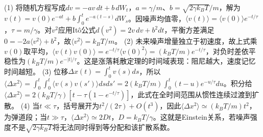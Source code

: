 (1) 将随机方程写成\(dv=-av\,dt+b\,dW_t\)，\(a=\gamma/m\)、\(b=\sqrt{2\gamma k_BT}/m\)，解为\(v(t)=v(0)e^{-at}+b\int_0^te^{-a(t-s)}dW_s\)。因噪声均值零，\(\langle v(t)\rangle=\langle v(0)\rangle e^{-t/\tau}\)，\(\tau=m/\gamma\)。对\(v^2\)应用Itô公式\(d(v^2)=2v\,dv+b^2dt\)，平衡方差满足\(0=-2a\langle v^2\rangle+b^2\)，故\(\langle v^2\rangle=k_BT/m\)。
(2) 未来噪声增量独立于初速度，故上式乘\(v(0)\)取平均，\(\langle v(t)v(0)\rangle=e^{-t/\tau}\langle v(0)^2\rangle=(k_BT/m)e^{-t/\tau}\)，对负时差依平稳性为\((k_BT/m)e^{-|t|/\tau}\)。这是涨落耗散定理的时间域表现：阻尼越大，速度记忆时间越短。
(3) 位移\(\Delta x(t)=\int_0^t v(s)ds\)，所以\(\langle\Delta x^2\rangle=\int_0^t\int_0^t\langle v(s)v(s')\rangle dsds'=2(k_BT/m)\int_0^t(t-u)e^{-u/\tau}du\)。积分给\(\langle\Delta x^2\rangle=2(k_BT/\gamma)[t-\tau(1-e^{-t/\tau})]\)，此式在全时间范围从惯性连续过渡到扩散。
(4) 当\(t\ll\tau\)，括号展开为\(t^2/(2\tau)+O(t^3)\)，因此\(\langle\Delta x^2\rangle\simeq(k_BT/m)t^2\)，为弹道段；当\(t\gg\tau\)，\(\langle\Delta x^2\rangle\simeq2Dt\)，\(D=k_BT/\gamma\)。这就是Einstein关系，若噪声强度不是\(\sqrt{2\gamma k_BT}\)将无法同时得到等分配和该扩散系数。
